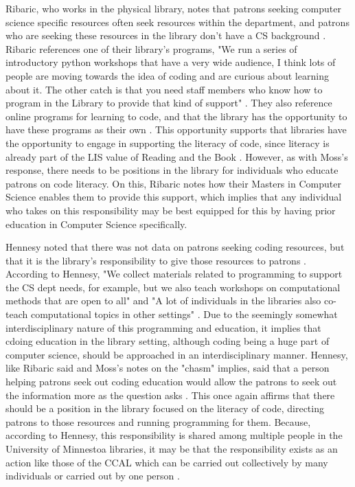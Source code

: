 Ribaric, who works in the physical library, notes that patrons seeking computer science specific resources often seek resources within the department, and patrons who are seeking these resources in the library don't have a CS background \cite{timinterview}. Ribaric references one of their library's programs, "We run a series of introductory python workshops that have a very wide audience, I think lots of people are moving towards the idea of coding and are curious about learning about it. The other catch is that you need staff members who know how to program in the Library to provide that kind of support" \cite{timinterview}. They also reference online programs for learning to code, and that the library has the opportunity to have these programs as their own \cite{timinterview}. This opportunity supports that libraries have the opportunity to engage in supporting the literacy of code, since literacy is already part of the LIS value of Reading and the Book \cite{rubin2016foundationslis}. However, as with Moss's response, there needs to be positions in the library for individuals who educate patrons on code literacy. On this, Ribaric notes how their Masters in Computer Science enables them to provide this support, which implies that any individual who takes on this responsibility may be best equipped for this by having prior education in Computer Science specifically. 

Hennesy noted that there was not data on patrons seeking coding resources, but that it is the library's responsibility to give those resources to patrons \cite{codyinterview}. According to Hennesy, "We collect materials related to programming to support the CS dept needs, for example, but we also teach workshops on computational methods that are open to all"\cite{codyinterview} and "A lot of individuals in the libraries also co-teach computational topics in other settings" \cite{codyinterview}. Due to the seemingly somewhat interdisciplinary nature of this programming and education, it implies that cdoing education in the library setting, although coding being a huge part of computer science, should be approached in an interdisciplinary manner. Hennesy, like Ribaric said and Moss's notes on the "chasm" implies, said that a person helping patrons seek out coding education would allow the patrons to seek out the information more as the question asks \cite{codyinterview}. This once again affirms that there should be a position in the library focused on the literacy of code, directing patrons to those resources and running programming for them. Because, according to Hennesy, this responsibility is shared among multiple people in the University of Minnestoa libraries, it may be that the responsibility exists as an action like those of the CCAL which can be carried out collectively by many individuals or carried out by one person \cite{codyinterview}. 

